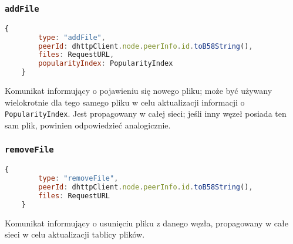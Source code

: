 % 

\subsubsection{\texttt{addFile}}
\begin{lstlisting}[language=javascript]
    {
        type: "addFile",
        peerId: dhttpClient.node.peerInfo.id.toB58String(),
        files: RequestURL,
        popularityIndex: PopularityIndex
    }
\end{lstlisting}

Komunikat informujący o pojawieniu się nowego pliku; może być używany wielokrotnie dla tego samego pliku w celu aktualizacji informacji o \texttt{PopularityIndex}. Jest propagowany w całej sieci; jeśli inny węzeł posiada ten sam plik, powinien odpowiedzieć analogicznie.


% 

\subsubsection{\texttt{removeFile}}
\begin{lstlisting}[language=javascript]
    {
        type: "removeFile",
        peerId: dhttpClient.node.peerInfo.id.toB58String(),
        files: RequestURL
    }
\end{lstlisting}

Komunikat informujący o usunięciu pliku z danego węzła, propagowany w całe sieci w celu aktualizacji tablicy plików.


